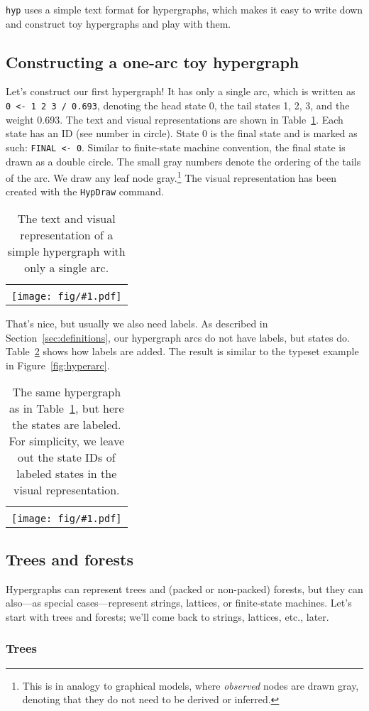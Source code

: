 \documentclass[12pt]{article}
\newcommand{\hyp}{\texttt{hyp}\xspace}
\newcommand{\hypdraw}{\texttt{HypDraw}\xspace}
\newcommand{\tabref}[1]{Table~\ref{tab:#1}}
\newcommand{\secref}[1]{Section~\ref{sec:#1}}
\newcommand{\figref}[1]{Figure~\ref{fig:#1}}
\newcommand{\exampleb}[3]{
  \begin{table}[!tbp]
    \centering
    \begin{tabular}[h]{ l }\hline
      \begin{minipage}{\textwidth}
        
      \end{minipage}
      \\
      \texttt{[image: fig/\#1.pdf]} \\\hline
    \end{tabular}
    \caption{#2}
    \label{tab:#1}
  \end{table}
}
\begin{document}
\hyp uses a simple text format for hypergraphs, which makes it easy to
write down and construct toy hypergraphs and play with them.

\subsection{Constructing a one-arc toy hypergraph}

Let's construct our first hypergraph! It has only a single arc, which
is written as \texttt{0 <- 1 2 3 / 0.693}, denoting the head state 0,
the tail states 1, 2, 3, and the weight 0.693.  The text and visual
representations are shown in \tabref{one_arc}.  Each state has an ID
(see number in circle). State 0 is the final state and is marked as
such: \texttt{FINAL <- 0}. Similar to finite-state machine convention,
the final state is drawn as a double circle. The small gray numbers
denote the ordering of the tails of the arc. We draw any leaf node
gray.\footnote{This is in analogy to graphical models, where
  \textit{observed} nodes are drawn gray, denoting that they do not need
  to be derived or inferred.}  The visual representation has been
created with the \hypdraw command.  \exampleb{one_arc}{The text and
  visual representation of a simple hypergraph with only a single
  arc.}{0.25}

That's nice, but usually we also need labels. As described in
\secref{definitions}, our hypergraph arcs do not have labels, but
states do. \tabref{one_arc_labels} shows how labels are added. The
result is similar to the typeset example in \figref{hyperarc}.

\exampleb{one_arc_labels}{The same hypergraph as in \tabref{one_arc},
  but here the states are labeled. For simplicity, we leave out the
  state IDs of labeled states in the visual representation.}{0.25}

\subsection{Trees and forests}

Hypergraphs can represent trees and (packed or non-packed) forests,
but they can also---as special cases---represent strings, lattices, or
finite-state machines. Let's start with trees and forests; we'll come
back to strings, lattices, etc., later.

\subsubsection{Trees}\label{sec:tree}
\end{document}
